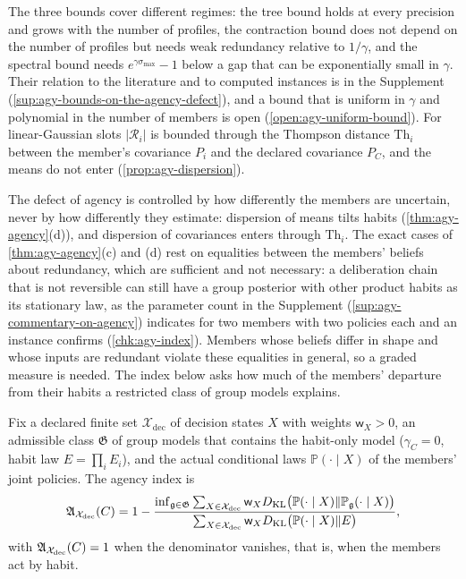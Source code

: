 
The three bounds cover different regimes: the tree bound holds at every precision and grows with the number of profiles, the contraction bound does not depend on the number of profiles but needs weak redundancy relative to $1/\gamma$, and the spectral bound needs $e^{\gamma\sigma_{\max}}-1$ below a gap that can be exponentially small in $\gamma$. Their relation to the literature and to computed instances is in the Supplement (\cref{sup:agy-bounds-on-the-agency-defect}), and a bound that is uniform in $\gamma$ and polynomial in the number of members is open (\cref{open:agy-uniform-bound}). For linear-Gaussian slots $\lvert\mathcal R_i\rvert$ is bounded through the Thompson distance $\mathrm{Th}_i$ between the member's covariance $P_i$ and the declared covariance $P_C$, and the means do not enter (\cref{prop:agy-dispersion}).

The defect of agency is controlled by how differently the members are uncertain, never by how differently they estimate: dispersion of means tilts habits (\cref{thm:agy-agency}(d)), and dispersion of covariances enters through $\mathrm{Th}_i$. The exact cases of \cref{thm:agy-agency}(c) and (d) rest on equalities between the members' beliefs about redundancy, which are sufficient and not necessary: a deliberation chain that is not reversible can still have a group posterior with other product habits as its stationary law, as the parameter count in the Supplement (\cref{sup:agy-commentary-on-agency}) indicates for two members with two policies each and an instance confirms (\cref{chk:agy-index}). Members whose beliefs differ in shape and whose inputs are redundant violate these equalities in general, so a graded measure is needed. The index below asks how much of the members' departure from their habits a restricted class of group models explains.

\begin{definition}\label{def:agy-agency-index}
Fix a declared finite set $\mathcal X_{\mathrm{dec}}$ of decision states $X$ with weights $\mathsf w_X>0$, an admissible class $\mathfrak G$ of group models that contains the habit-only model ($\gamma_C=0$, habit law $E=\prod_iE_i$), and the actual conditional laws $\mathbb P(\cdot\mid X)$ of the members' joint policies. The agency index is
\begin{equation}\label{eq:agy-index}
\mathfrak{A}_{\mathcal X_{\mathrm{dec}}}(C)=1-\frac{\inf_{\mathfrak g\in\mathfrak G}\sum_{X\in\mathcal X_{\mathrm{dec}}}\mathsf w_XD_{\mathrm{KL}}\bigl(\mathbb P(\cdot\mid X)\Vert\mathbb P_{\mathfrak g}(\cdot\mid X)\bigr)}{\sum_{X\in\mathcal X_{\mathrm{dec}}}\mathsf w_XD_{\mathrm{KL}}\bigl(\mathbb P(\cdot\mid X)\Vert E\bigr)},
\end{equation}
with $\mathfrak{A}_{\mathcal X_{\mathrm{dec}}}(C)=1$ when the denominator vanishes, that is, when the members act by habit.
\end{definition}


